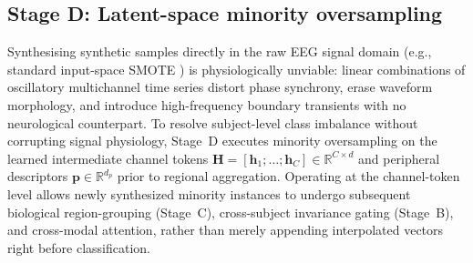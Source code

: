 \documentclass[a4paper,fleqn]{cas-sc}
\begin{document}
\subsection{Stage D: Latent-space minority oversampling}
\label{sec:stage_d}
Synthesising synthetic samples directly in the raw EEG signal domain (e.g., standard input-space SMOTE \citep{elreedy2021smote}) is physiologically unviable: linear combinations of oscillatory multichannel time series distort phase synchrony, erase waveform morphology, and introduce high-frequency boundary transients with no neurological counterpart. To resolve subject-level class imbalance without corrupting signal physiology, Stage~D executes minority oversampling on the learned intermediate channel tokens $\mathbf{H} = [\mathbf{h}_1;\dots;\mathbf{h}_C] \in \mathbb{R}^{C \times d}$ and peripheral descriptors $\mathbf{p}\in\mathbb{R}^{d_p}$ prior to regional aggregation. Operating at the channel-token level allows newly synthesized minority instances to undergo subsequent biological region-grouping (Stage~C), cross-subject invariance gating (Stage~B), and cross-modal attention, rather than merely appending interpolated vectors right before classification.
\end{document}
